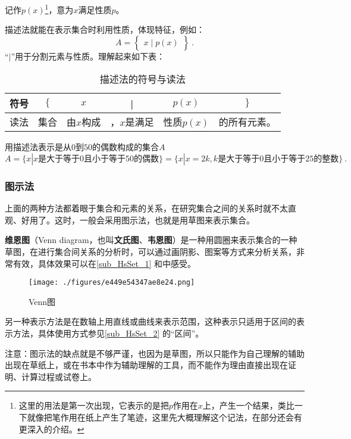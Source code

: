 记作$p(x)$\footnote{这里的用法是第一次出现，它表示的是把$p$作用在$x$上，产生一个结果，类比一下就像把笔作用在纸上产生了笔迹，这里先大概理解这个记法，在部分还会有更深入的介绍。}，意为$x$满足性质$p$。

描述法就能在表示集合时利用性质，体现特征，例如：
\begin{equation}
A=\begin{Bmatrix} x\mid p(x) \end{Bmatrix}~.
\end{equation}
“$|$”用于分割元素与性质。理解起来如下表：
\begin{table}[h]
\caption{描述法的符号与读法}\label{tab_HsSet1}
\centering
\begin{tabular}{|c|c|c|c|c|c|}
\hline
符号 & $\{$&$x$ &|& $p(x)$&$\}$ \\
\hline
读法 & 集合&由$x$构成&，$x$是满足& 性质$p(x)$&的所有元素。 \\
\hline
\end{tabular}
\end{table}

\begin{example}{用描述法表示是从$0$到$50$的偶数构成的集合$A$}
$$A=\{x|x\text{是大于等于}0\text{且小于等于}50\text{的偶数}\}=\{x|x=2k,k\text{是大于等于}0\text{且小于等于}25\text{的整数}\}~.$$
\end{example}

\subsubsection{图示法}
上面的两种方法都着眼于集合和元素的关系，在研究集合之间的关系时就不太直观、好用了。这时，一般会采用图示法，也就是用草图来表示集合。

\textbf{维恩图}（Venn diagram，也叫\textbf{文氏图}、\textbf{韦恩图}）是一种用圆圈来表示集合的一种草图，在进行集合间关系的分析时，可以通过画阴影、图案等方式来分析关系，非常有效，具体效果可以在\autoref{sub_HsSet_1} 和中感受。
\begin{figure}[ht]
\centering
\texttt{[image: ./figures/e449e54347ae8e24.png]}
\caption{Venn图} \label{fig_SufCnd_1}
\end{figure}

另一种表示方法是在数轴上用直线或曲线来表示范围，这种表示只适用于区间的表示方法，具体使用方式参见\autoref{sub_HsSet_2} 的“区间”。

注意：图示法的缺点就是不够严谨，也因为是草图，所以只能作为自己理解的辅助出现在草纸上，或在书本中作为辅助理解的工具，而不能作为理由直接出现在证明、计算过程或试卷上。

